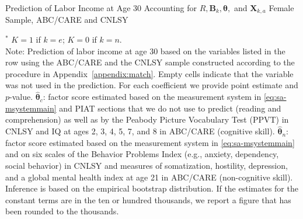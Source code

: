 \begin{table}
\begin{threeparttable}
\caption{Prediction of Labor Income at Age 30 Accounting for $R, \bm{B}_k, \bm{\theta},$ and $\bm{X}_{k,a}$ Female Sample, ABC/CARE and CNLSY}
\label{table:inv0}
\centering
\scriptsize

\begin{tablenotes}
\footnotesize
\item $^\ast$ $K=1$ if $k=e$; $K=0$ if $k=n$.\\ 
Note: Prediction of labor income at age 30 based on the variables listed in the row using the ABC/CARE and the CNLSY sample constructed according to the procedure in Appendix~\ref{appendix:match}. Empty cells indicate that the variable was not used in the prediction. For each coefficient we provide point estimate and $p$-value. $\hat{\bm{\theta}}_{c}$: factor score estimated based on the measurement system in \eqref{eq:sa-msystemmain} and PIAT sections that we do not use to predict (reading and comprehension) as well as by the Peabody Picture Vocabulary Test (PPVT) in CNLSY and IQ at ages 2, 3, 4, 5, 7, and 8 in ABC/CARE (cognitive skill). $\hat{\bm{\theta}}_{n}$: factor score estimated based on the measurement system in \eqref{eq:sa-msystemmain} and on six scales of the Behavior Problems Index (e.g., anxiety, dependency, social behavior) in CNLSY and measures of somatization, hostility, depression, and a global mental health index at age 21 in ABC/CARE (non-cognitive skill). Inference is based on the empirical bootstrap distribution. If the estimates for the constant terms are in the ten or hundred thousands, we report a figure that has been rounded to the thousands.
\end{tablenotes}
\end{threeparttable}
\end{table}

